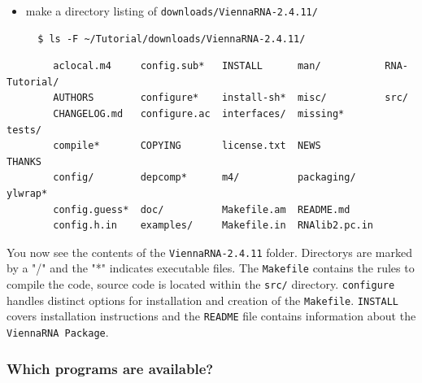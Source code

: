 \documentclass[a4paper]{article}
\newcommand{\frametitle}[1]{\subsubsection{#1}}
\begin{document}
  \begin{itemize}
  \item make a directory listing of \texttt{downloads/ViennaRNA-2.4.11/}
\begin{verbatim}
  $ ls -F ~/Tutorial/downloads/ViennaRNA-2.4.11/
\end{verbatim}
  \end{itemize}
  \footnotesize
  \begin{center}
    \begin{verbatim}
        aclocal.m4     config.sub*   INSTALL      man/           RNA-Tutorial/
        AUTHORS        configure*    install-sh*  misc/          src/
        CHANGELOG.md   configure.ac  interfaces/  missing*       tests/
        compile*       COPYING       license.txt  NEWS           THANKS
        config/        depcomp*      m4/          packaging/     ylwrap*
        config.guess*  doc/          Makefile.am  README.md
        config.h.in    examples/     Makefile.in  RNAlib2.pc.in
    \end{verbatim}%
  \end{center}
You now see the contents of the \texttt{ViennaRNA-2.4.11} folder. Directorys are marked 
by a "/" and the "*" indicates executable files. The \texttt{Makefile} contains the rules to
compile the code, source code is located within the \texttt{src/} directory. \texttt{configure}
handles distinct options for installation and creation of the \texttt{Makefile}. \texttt{INSTALL}
covers installation instructions and the \texttt{README} file contains information about the
\texttt{ViennaRNA Package}.


  \frametitle{Which programs are available?}
\end{document}
